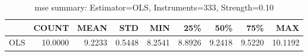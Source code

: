 \begin{table}[ht]
\centering
\caption{mse summary: Estimator=OLS, Instruments=333, Strength=0.10}
\begin{tabular}{lrrrrrrrr}
\toprule
 & COUNT & MEAN & STD & MIN & 25\% & 50\% & 75\% & MAX \\
\midrule
OLS & 10.0000 & 9.2233 & 0.5448 & 8.2541 & 8.8926 & 9.2418 & 9.5220 & 10.1192 \\
\bottomrule
\end{tabular}
\end{table}
